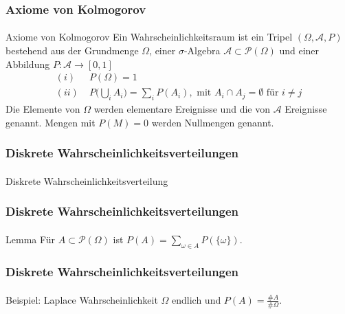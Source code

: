 \documentclass{beamer}
\begin{document}
\begin{frame}
    \frametitle{Axiome von Kolmogorov}
\framesubtitle{}
\begin{block}{Axiome von Kolmogorov}
Ein Wahrscheinlichkeitsraum ist ein Tripel $(\Omega, \mathcal{A}, P)$ bestehend aus der Grundmenge $\Omega$, einer $\sigma$-Algebra $\mathcal{A} \subset  \mathcal{P}(\Omega)$ und einer Abbildung
$P : \mathcal{A} \to [0,1]$
\begin{align*}
(i) & \; P(\Omega) = 1 \\
(ii) & \;  P \biggl(  \bigcup_i A_i  \biggr) = \sum_i P(A_i), \text{ mit } A_i \cap A_j = \emptyset \text{ für } i \neq j
\end{align*}
Die Elemente von $\Omega$ werden elementare Ereignisse und die von $\mathcal{A}$ Ereignisse genannt. Mengen mit $P(M) = 0$ werden Nullmengen genannt.
\end{block}
 \end{frame}





\begin{frame}
    \frametitle{Diskrete Wahrscheinlichkeitsverteilungen}
\framesubtitle{}

\begin{block}{Diskrete Wahrscheinlichkeitsverteilung}

\end{block}


 \end{frame}



\begin{frame}
    \frametitle{Diskrete Wahrscheinlichkeitsverteilungen}
\framesubtitle{}

\begin{block}{Lemma}
Für $A \subset \mathcal{P}(\Omega)$ ist
$P(A) = \sum_{\omega \in A} P(\{ \omega \})$.
\end{block}

 \end{frame}



\begin{frame}
    \frametitle{Diskrete Wahrscheinlichkeitsverteilungen}
\framesubtitle{}

\begin{block}{Beispiel: Laplace Wahrscheinlichkeit}
$\Omega$ endlich und $P(A) = \frac{\#A}{\#\Omega}$.
\end{block}
 \end{frame}
\end{document}
